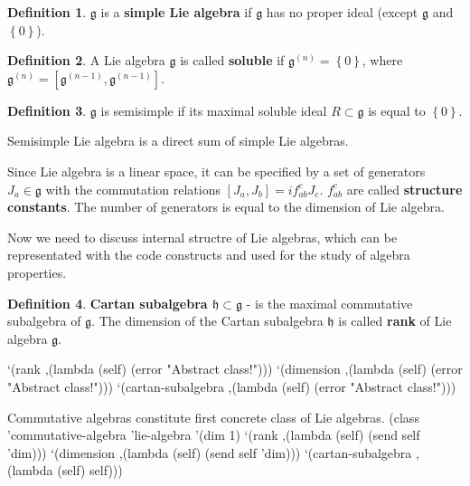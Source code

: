 \documentclass[a4paper,10pt]{article}%
\theoremstyle{definition} \newtheorem{Def}{Definition}
\begin{document}
\begin{Def}
  $\mathfrak{g}$ is a {\bf simple Lie algebra} if $\mathfrak{g}$ has no proper ideal (except $\mathfrak{g}$ and $\left\{0\right\}$).
\end{Def}

\begin{Def}
  A Lie algebra $\mathfrak{g}$ is called {\bf soluble} if $\mathfrak{g}^{(n)}=\left\{0\right\}$, where $\mathfrak{g}^{(n)}=[\mathfrak{g}^{(n-1)},\mathfrak{g}^{(n-1)}]$.
\end{Def}
\begin{Def}
  $\mathfrak{g}$ is semisimple if its maximal soluble ideal $R\subset\mathfrak{g}$ is equal to $\left\{0\right\}$.
\end{Def}
Semisimple Lie algebra is a direct sum of simple Lie algebras.

Since Lie algebra is a linear space, it can be specified by a set of generators $J_a\in \mathfrak{g}$ with the commutation relations $[J_a,J_b]=if_{ab}^cJ_c$. $f_{ab}^c$ are called {\bf structure constants}. The number of generators is equal to the dimension of Lie algebra.

Now we need to discuss internal structre of Lie algebras, which can be representated with the code constructs and used for the study of algebra properties.

\begin{Def}
  {\bf Cartan subalgebra $\mathfrak{h}\subset\mathfrak{g}$} - is the maximal commutative subalgebra of $\mathfrak{g}$. The dimension of the Cartan subalgebra $\mathfrak{h}$ is called {\bf rank} of Lie algebra $\mathfrak{g}$.
\end{Def}
\nwenddocs{}\endmoddef\nwstartdeflinemarkup{}\nwenddeflinemarkup
`(rank ,(lambda (self)
              (error "Abstract class!")))
`(dimension ,(lambda (self)
              (error "Abstract class!")))
`(cartan-subalgebra ,(lambda (self) 
              (error "Abstract class!")))

\nwendcode{}\nwdocspar
Commutative algebras constitute first concrete class of Lie algebras.
\nwenddocs{}\endmoddef\nwstartdeflinemarkup{}\nwenddeflinemarkup
(class 'commutative-algebra 'lie-algebra
       '(dim 1)
       `(rank ,(lambda (self) (send self 'dim)))
       `(dimension ,(lambda (self) (send self 'dim)))
       `(cartan-subalgebra ,(lambda (self) self)))
\end{document}
